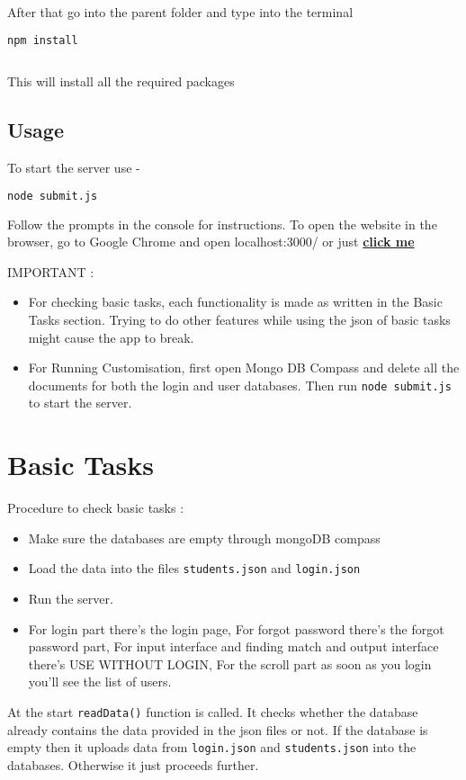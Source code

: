 \documentclass{article}
\begin{document}
After that go into the parent folder and type into the terminal 

\begin{lstlisting}[language=bash]
    npm install
    
\end{lstlisting}
This will install all the required packages

\subsection{Usage}

To start the server use -
\begin{lstlisting}[language=bash]
    node submit.js
\end{lstlisting}
Follow the prompts in the console for instructions. To open the website in the browser, go to Google Chrome and open localhost:3000/ or just \href{localhost:3000/}{\textbf{click me}}

IMPORTANT :
\begin{itemize}
    \item For checking basic tasks, each functionality is made as written in the Basic Tasks section. Trying to do other features while using the json of basic tasks might cause the app to break. 
    \item For Running Customisation, first open Mongo DB Compass and delete all the documents for both the login and user databases. Then run \texttt{node submit.js} to start the server.
\end{itemize}

\section{Basic Tasks}
Procedure to check basic tasks :
\begin{itemize}
    \item Make sure the databases are empty through mongoDB compass
    \item Load the data into the files \texttt{students.json} and \texttt{login.json}
    \item Run the server.
    \item For login part there's the login page, For forgot password there's the forgot password part, For input interface and finding match and output interface there's USE WITHOUT LOGIN, For the scroll part as soon as you login you'll see the list of users.
\end{itemize}
At the start \texttt{readData()} function is called. It checks whether the database already contains the data provided in the json files or not. If the database is empty then it uploads data from \texttt{login.json} and \texttt{students.json} into the databases. Otherwise it just proceeds further.
\end{document}
